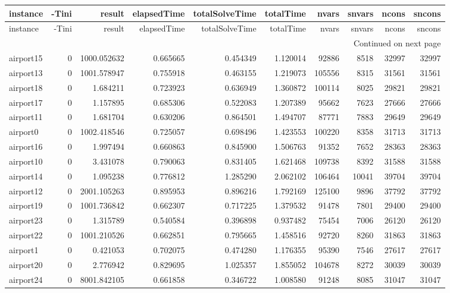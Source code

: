 \documentclass[../../../thesis.tex]{subfiles}
\begin{document}
\tiny
\begin{longtable}{|l|r|r|r|r|r|r|r|r|r|}
\toprule
instance & -Tini & result & elapsedTime & totalSolveTime & totalTime & nvars & snvars & ncons & sncons \\
\midrule
\endfirsthead
\toprule
instance & -Tini & result & elapsedTime & totalSolveTime & totalTime & nvars & snvars & ncons & sncons \\
\midrule
\endhead
\midrule
\multicolumn{10}{r}{Continued on next page} \\
\midrule
\endfoot
\bottomrule
\endlastfoot
airport15 & 0 & 1000.052632 & 0.665665 & 0.454349 & 1.120014 & 92886 & 8518 & 32997 & 32997 \\
airport13 & 0 & 1001.578947 & 0.755918 & 0.463155 & 1.219073 & 105556 & 8315 & 31561 & 31561 \\
airport18 & 0 & 1.684211 & 0.723923 & 0.636949 & 1.360872 & 100114 & 8025 & 29821 & 29821 \\
airport17 & 0 & 1.157895 & 0.685306 & 0.522083 & 1.207389 & 95662 & 7623 & 27666 & 27666 \\
airport11 & 0 & 1.681704 & 0.630206 & 0.864501 & 1.494707 & 87771 & 7883 & 29649 & 29649 \\
airport0 & 0 & 1002.418546 & 0.725057 & 0.698496 & 1.423553 & 100220 & 8358 & 31713 & 31713 \\
airport16 & 0 & 1.997494 & 0.660863 & 0.845900 & 1.506763 & 91352 & 7652 & 28363 & 28363 \\
airport10 & 0 & 3.431078 & 0.790063 & 0.831405 & 1.621468 & 109738 & 8392 & 31588 & 31588 \\
airport14 & 0 & 1.095238 & 0.776812 & 1.285290 & 2.062102 & 106464 & 10041 & 39704 & 39704 \\
airport12 & 0 & 2001.105263 & 0.895953 & 0.896216 & 1.792169 & 125100 & 9896 & 37792 & 37792 \\
airport19 & 0 & 1001.736842 & 0.662307 & 0.717225 & 1.379532 & 91478 & 7801 & 29400 & 29400 \\
airport23 & 0 & 1.315789 & 0.540584 & 0.396898 & 0.937482 & 75454 & 7006 & 26120 & 26120 \\
airport22 & 0 & 1001.210526 & 0.662851 & 0.795665 & 1.458516 & 92720 & 8260 & 31863 & 31863 \\
airport1 & 0 & 0.421053 & 0.702075 & 0.474280 & 1.176355 & 95390 & 7546 & 27617 & 27617 \\
airport20 & 0 & 2.776942 & 0.829695 & 1.025357 & 1.855052 & 104678 & 8272 & 30039 & 30039 \\
airport24 & 0 & 8001.842105 & 0.661858 & 0.346722 & 1.008580 & 91248 & 8085 & 31047 & 31047 \\

\end{longtable}
\end{document}
